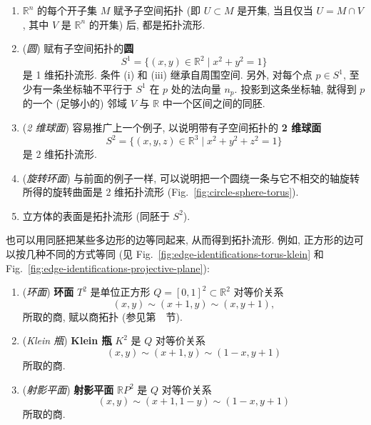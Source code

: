 \begin{RiemannExample}\label{ex:manifolds-from-euclidean-space}
\begin{enumerate}[label=(\arabic*),leftmargin=*]
\item $\mathbb{R}^n$ 的每个开子集 $M$ 赋予子空间拓扑 (即 $U\subset M$ 是开集, 当且仅当 $U=M\cap V$, 其中 $V$ 是 $\mathbb{R}^n$ 的开集) 后, 都是拓扑流形.
\item (\emph{圆}) 赋有子空间拓扑的\textbf{圆}
\[
  S^1=\{(x,y)\in\mathbb{R}^2\mid x^2+y^2=1\}
\]
是 1 维拓扑流形. 条件 (i) 和 (iii) 继承自周围空间. 另外, 对每个点 $p\in S^1$, 至少有一条坐标轴不平行于 $S^1$ 在 $p$ 处的法向量 $n_p$. 投影到这条坐标轴, 就得到 $p$ 的一个 (足够小的) 邻域 $V$ 与 $\mathbb{R}$ 中一个区间之间的同胚.
\item (\emph{2 维球面}) 容易推广上一个例子, 以说明带有子空间拓扑的 \textbf{2 维球面}
\[
  S^2=\{(x,y,z)\in\mathbb{R}^3\mid x^2+y^2+z^2=1\}
\]
是 2 维拓扑流形.
\item (\emph{旋转环面}) 与前面的例子一样, 可以说明把一个圆绕一条与它不相交的轴旋转所得的旋转曲面是 2 维拓扑流形 (Fig.~\ref{fig:circle-sphere-torus}).
\item 立方体的表面是拓扑流形 (同胚于 $S^2$).
\end{enumerate}
\end{RiemannExample}

\begin{RiemannExample}\label{ex:manifolds-by-identifying-edges}
也可以用同胚把某些多边形的边等同起来, 从而得到拓扑流形. 例如, 正方形的边可以按几种不同的方式等同 (见 Fig.~\ref{fig:edge-identifications-torus-klein} 和 Fig.~\ref{fig:edge-identifications-projective-plane}):
\begin{enumerate}[label=(\arabic*),leftmargin=*]
\item (\emph{环面}) \textbf{环面} $T^2$ 是单位正方形 $Q=[0,1]^2\subset\mathbb{R}^2$ 对等价关系
\[
  (x,y)\sim(x+1,y)\sim(x,y+1),
\]
所取的商, 赋以商拓扑 (参见第~~节).
\item (\emph{Klein 瓶}) \textbf{Klein 瓶} $K^2$ 是 $Q$ 对等价关系
\[
  (x,y)\sim(x+1,y)\sim(1-x,y+1)
\]
所取的商.
\item (\emph{射影平面}) \textbf{射影平面} $\mathbb{R}P^2$ 是 $Q$ 对等价关系
\[
  (x,y)\sim(x+1,1-y)\sim(1-x,y+1)
\]
所取的商.
\end{enumerate}
\end{RiemannExample}

